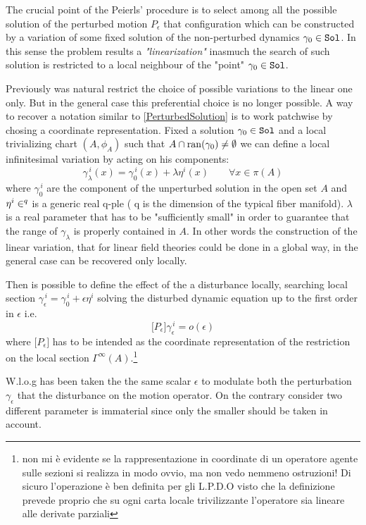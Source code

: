 \documentclass[Main]{subfiles}
\begin{document}
		The crucial point of the Peierls' procedure  is to select among all the possible solution of the perturbed motion $P_\epsilon$ that configuration which can be constructed by a variation of some fixed solution of the non-perturbed dynamics $\gamma_0 \in \mathtt{Sol}$.
		In this sense the problem results a \emph{"linearization"} inasmuch the  search of such solution is restricted to a local neighbour of the "point" $\gamma_0\in \mathtt{Sol}$.

		Previously was natural restrict the choice of possible variations to the linear one only. But in the general case this preferential choice is no longer possible.
		A way to  recover a notation similar to \ref{PerturbedSolution} is to work patchwise by chosing a coordinate representation.
		Fixed a solution $\gamma_0 \in \mathtt{Sol}$ and a local trivializing chart $(A, \phi_A)$ such that $A\cap \mathrm{ran}(\gamma_0) \neq \emptyset$ we can define a local infinitesimal variation by acting on his components:
		\begin{displaymath}
			\gamma_\lambda ^{\, i}(x) = \gamma_0^{\, i}(x) + \lambda \eta^i(x) \qquad \forall x\in \pi(A)
		\end{displaymath}
		where $ \gamma_0^{\, i}$ are the component of the unperturbed solution in the open set $A$ and $\eta^i\in \real^q$ is a generic  real q-ple ( q is the dimension of the typical fiber manifold).
		$\lambda$ is a real parameter that has to be "sufficiently small" in order to guarantee that the range of $\gamma_\lambda$ is properly contained in $A$.
		In other words the construction of the linear variation, that for linear field theories could be done in a global way, in the general case can be recovered only locally.
		
		Then is possible to define the effect of the a disturbance locally, searching local section $\gamma_\epsilon^{\, i} = \gamma_0^{\, i} + \epsilon \eta^{i}$ solving the disturbed dynamic equation up to the first order in $\epsilon$ i.e. 
		\begin{displaymath}
			\big[ P_\epsilon \big] \gamma_\epsilon^{\,i} = o(\epsilon)
		\end{displaymath}
		where $\big[ P_\epsilon \big] $ has to be intended as the coordinate representation of the restriction on the local section $\Gamma^\infty(A)$.\danger\footnote{non mi è evidente se la rappresentazione in coordinate di un operatore agente sulle sezioni si realizza in modo ovvio, ma non vedo nemmeno ostruzioni! Di sicuro l'operazione è ben definita per gli L.P.D.O visto che la definizione prevede proprio che su ogni carta locale trivilizzante l'operatore sia lineare alle derivate parziali }
		\begin{observation}
		W.l.o.g has been taken the the same scalar $\epsilon$  to modulate both the perturbation $\gamma_\epsilon$ that the disturbance on the motion operator.
		On the contrary consider two different parameter is immaterial since only the smaller should be taken in account.
		\end{observation}
\end{document}
